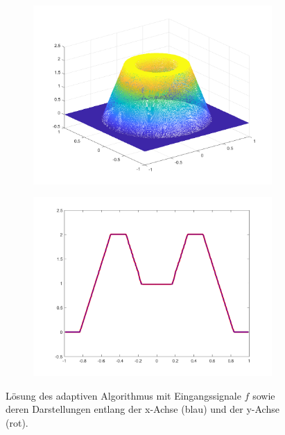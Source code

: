 \begin{figure}[p]
  \centering
  \begin{subfigure}[b]{.48\linewidth}
    \centering
    \includegraphics[trim = 40 30 30 30, clip, width=\linewidth]
      {pictures/chapExperiments/secExactSol/f01/adaptive/lvl14/solution.png}
    \label{fig:f01SolAdaptivePlot}
  \end{subfigure}
  \quad
  \begin{subfigure}[b]{.48\linewidth}
    \centering
    \includegraphics[trim = 50 30 50 20, clip, width=\linewidth]
      {pictures/chapExperiments/secExactSol/f01/adaptive/lvl14/solutionAxis.png}
    \label{fig:f01SolAdaptiveAxis}
  \end{subfigure}
  \caption{Lösung des adaptiven Algorithmus mit Eingangssignale $f$ sowie deren
  Darstellungen entlang der x-Achse (blau) und der y-Achse (rot).}
  \label{fig:f01SolAdaptive}
\end{figure}
